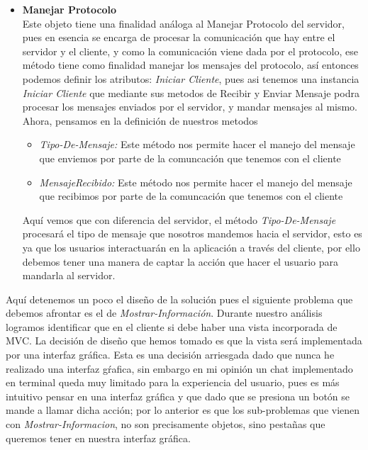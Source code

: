 \documentclass[10pt,letterpaper]{report}
\begin{document}
\begin{itemize}
        \item[-] \textbf{Manejar Protocolo}\\
        \noindent Este objeto tiene una finalidad análoga al Manejar Protocolo del servidor, pues en esencia se encarga de procesar la comunicación que hay entre el servidor y el cliente, y como la comunicación viene dada por el protocolo, ese método tiene como finalidad manejar los mensajes del protocolo, así entonces podemos definir los atributos: \textit{Iniciar Cliente}, pues asi tenemos una instancia \textit{Iniciar Cliente} que mediante sus metodos de Recibir y Enviar Mensaje podra procesar los mensajes enviados por el servidor, y mandar mensajes al mismo.
        Ahora, pensamos en la definición de nuestros metodos
            \begin{itemize}
                \item[-] {\textit{Tipo-De-Mensaje:}} Este método nos permite hacer el manejo del mensaje que enviemos por parte de la comuncación que tenemos con el cliente
                \item[-] {\textit{MensajeRecibido:}} Este método nos permite hacer el manejo del mensaje que recibimos por parte de la comuncación que tenemos con el cliente
            \end{itemize}
                        \noindent Aquí vemos que con diferencia del servidor, el método \textit{Tipo-De-Mensaje} procesará el tipo de mensaje que nosotros mandemos hacia el servidor, esto es ya que los usuarios interactuarán en la aplicación a través del cliente, por ello debemos tener una manera de captar la acción que hacer el usuario para mandarla al servidor.
            \end{itemize}
            
        \vspace{0.2cm}
        
        \noindent Aquí detenemos un poco el diseño de la solución pues el siguiente problema que debemos afrontar es el de \textit{Mostrar-Información}. Durante nuestro análisis logramos identificar que en el cliente si debe haber una vista incorporada de MVC. La decisión de diseño que hemos tomado es que la vista será implementada por una interfaz gráfica. Esta es una decisión arriesgada dado que nunca he realizado una interfaz gŕafica, sin embargo en mi opinión un chat implementado en terminal queda muy limitado para la experiencia del usuario, pues es más intuitivo pensar en una interfaz gráfica y que dado que se presiona un botón se mande a llamar dicha acción; por lo anterior es que los sub-problemas que vienen con \textit{Mostrar-Informacion}, no son precisamente objetos, sino pestañas que queremos tener en nuestra interfaz gráfica.
                \vspace{0.2cm}
                
\end{document}
